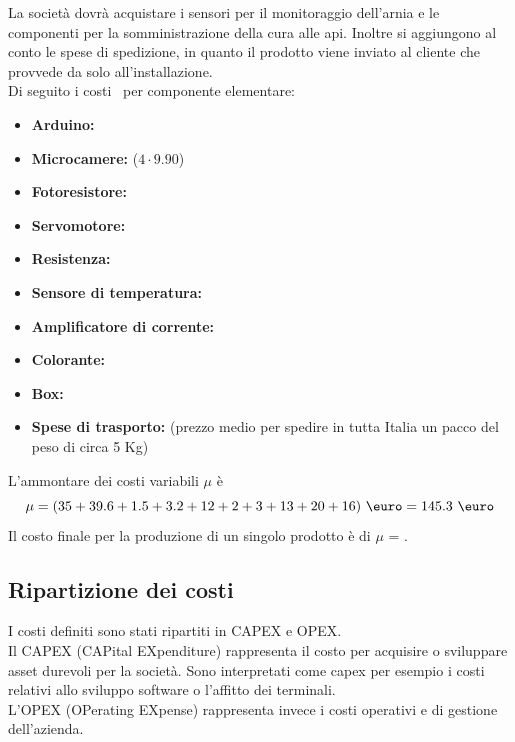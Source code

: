 La società dovrà acquistare i sensori per il monitoraggio dell’arnia e le
componenti per la somministrazione della cura alle api. Inoltre si aggiungono al
conto le spese di spedizione, in quanto il prodotto viene inviato al cliente che
provvede da solo all’installazione.\\
%
Di seguito i costi~\cite{hw} per componente elementare:
\begin{itemize}
\item \textbf{Arduino: }
\item \textbf{Microcamere: } ($4 \cdot 9.90$\EUR{})
\item \textbf{Fotoresistore: }
\item \textbf{Servomotore: }
\item \textbf{Resistenza: }
\item \textbf{Sensore di temperatura: }
\item \textbf{Amplificatore di corrente: }
\item \textbf{Colorante: }
\item \textbf{Box: }
\item \textbf{Spese di trasporto: } (prezzo medio per spedire in tutta
Italia un pacco del peso di circa 5 Kg)
\end{itemize}
L’ammontare dei costi variabili $\mu$ è
\begin{displaymath}
\mu= (35 + 39.6 + 1.5 + 3.2 + 12 + 2 + 3 + 13  + 20 + 16) \ \mbox{\euro} = 145.3
\ \mbox{\euro}
\end{displaymath}
Il costo finale per la produzione di un singolo prodotto è di $\mu$ = .
\subsection{Ripartizione dei costi}
I costi definiti sono stati ripartiti in CAPEX e OPEX.\\
Il CAPEX (CAPital EXpenditure) rappresenta il costo per acquisire o sviluppare
asset durevoli per la società. Sono interpretati come capex per esempio i costi
relativi allo sviluppo software o l’affitto dei terminali.\\
L’OPEX (OPerating EXpense) rappresenta invece i costi operativi e di gestione
dell’azienda.

